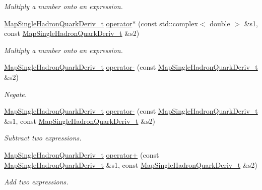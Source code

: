 \begin{DoxyCompactItemize}
\begin{DoxyCompactList}\small\item\em Multiply a number onto an expression. \end{DoxyCompactList}\item 
\mbox{\hyperlink{namespaceHadron_aa588220689caea8a6aad4d0296526e6b}{Map\+Single\+Hadron\+Quark\+Deriv\+\_\+t}} \mbox{\hyperlink{namespaceHadron_aee77eafb416d7080a53fa0bd52528d11}{operator$\ast$}} (const std\+::complex$<$ double $>$ \&s1, const \mbox{\hyperlink{namespaceHadron_aa588220689caea8a6aad4d0296526e6b}{Map\+Single\+Hadron\+Quark\+Deriv\+\_\+t}} \&s2)
\begin{DoxyCompactList}\small\item\em Multiply a number onto an expression. \end{DoxyCompactList}\item 
\mbox{\hyperlink{namespaceHadron_aa588220689caea8a6aad4d0296526e6b}{Map\+Single\+Hadron\+Quark\+Deriv\+\_\+t}} \mbox{\hyperlink{namespaceHadron_a3420e25a6674cbce229ba6b98f1fa85a}{operator-\/}} (const \mbox{\hyperlink{namespaceHadron_aa588220689caea8a6aad4d0296526e6b}{Map\+Single\+Hadron\+Quark\+Deriv\+\_\+t}} \&s2)
\begin{DoxyCompactList}\small\item\em Negate. \end{DoxyCompactList}\item 
\mbox{\hyperlink{namespaceHadron_aa588220689caea8a6aad4d0296526e6b}{Map\+Single\+Hadron\+Quark\+Deriv\+\_\+t}} \mbox{\hyperlink{namespaceHadron_a064800b32b071a140c16ef8416cfa165}{operator-\/}} (const \mbox{\hyperlink{namespaceHadron_aa588220689caea8a6aad4d0296526e6b}{Map\+Single\+Hadron\+Quark\+Deriv\+\_\+t}} \&s1, const \mbox{\hyperlink{namespaceHadron_aa588220689caea8a6aad4d0296526e6b}{Map\+Single\+Hadron\+Quark\+Deriv\+\_\+t}} \&s2)
\begin{DoxyCompactList}\small\item\em Subtract two expressions. \end{DoxyCompactList}\item 
\mbox{\hyperlink{namespaceHadron_aa588220689caea8a6aad4d0296526e6b}{Map\+Single\+Hadron\+Quark\+Deriv\+\_\+t}} \mbox{\hyperlink{namespaceHadron_afa83538fb097946f87e6f98180c378b5}{operator+}} (const \mbox{\hyperlink{namespaceHadron_aa588220689caea8a6aad4d0296526e6b}{Map\+Single\+Hadron\+Quark\+Deriv\+\_\+t}} \&s1, const \mbox{\hyperlink{namespaceHadron_aa588220689caea8a6aad4d0296526e6b}{Map\+Single\+Hadron\+Quark\+Deriv\+\_\+t}} \&s2)
\begin{DoxyCompactList}\small\item\em Add two expressions. \end{DoxyCompactList}\item 

\end{DoxyCompactItemize}
